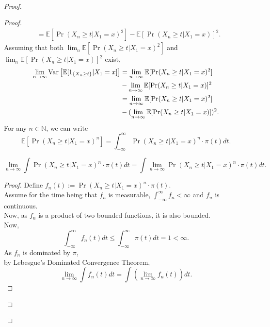 \begin{theorem}
\begin{proof}
\begin{lem}
\begin{proof}
\begin{align*}
                    &= \mathbb{E}[\Pr(X_{n} \geq t | X_{1} = x)^2] - \mathbb{E}[\Pr(X_{n} \geq t | X_{1} = x)]^2.
                \end{align*}
                Assuming that both $\lim_n \mathbb{E}[\Pr(X_{n} \geq t | X_{1} = x)^2]$ and  $\lim_n \mathbb{E}[\Pr(X_{n} \geq t | X_{1} = x)]^2$ exist,
                \begin{align*}
                    \lim_{n \rightarrow \infty} \text{Var}\left[{{\mathbb{E}[1_{\{X_{n} \geq t\}}|X_1=x]}}\right] &= \lim_{n \rightarrow \infty} \mathbb{E}[\Pr(X_{n} \geq t | X_{1} = x)^2]\\
                    &- \lim_{n \rightarrow \infty} \mathbb{E}[\Pr(X_{n} \geq t | X_{1} = x)]^2\\
                    &= \lim_{n \rightarrow \infty} \mathbb{E}[\Pr(X_{n} \geq t | X_{1} = x)^2]\\
                    &- (\lim_{n \rightarrow \infty} \mathbb{E}[\Pr(X_{n} \geq t | X_{1} = x)])^2.\\
                \end{align*}
                For any $n \in \mathbb{N}$, we can write
                $$\mathbb{E}[\Pr(X_{n} \geq t | X_{1} = x)^n] = \int_{-\infty}^{\infty} \Pr(X_{n} \geq t | X_{1} = x)^n \cdot \pi(t)dt.$$
                \begin{lem}
                    $$\lim_{n \rightarrow \infty} \int \Pr(X_{n} \geq t | X_{1} = x)^n \cdot \pi(t) dt = \int \lim_{n \rightarrow \infty}\Pr(X_{n} \geq t | X_{1} = x)^n \cdot \pi(t)dt.$$
                    \begin{proof}
                        Define $f_n(t) := \Pr(X_{n} \geq t | X_{1} = x)^n \cdot \pi(t)$. \\
                        Assume for the time being that $f_n$ is measurable, $\int_{-\infty}^{\infty} f_n < \infty$ and $f_n$ is continuous.\\
                        Now, as $f_n$ is a product of two bounded functions, it is also bounded. \\
                        Now,
                        $$\int_{-\infty}^{\infty} f_n(t)dt \leq \int_{-\infty}^{\infty} \pi(t)dt = 1 < \infty.$$
                        As $f_n$ is dominated by $\pi$, \\
                        by Lebesgue's Dominated Convergence Theorem,
                        $$\lim_{n \rightarrow \infty} \int f_n(t) dt = \int (\lim_{n \rightarrow \infty} f_n(t)) dt.$$
                    \end{proof}
                \end{lem}

\end{proof}
\end{lem}
\end{proof}
\end{theorem}
